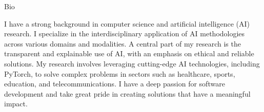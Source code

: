 \begin{rubric}{Bio}
\entry*[]

I have a strong background in computer science and artificial intelligence (AI) research. I specialize in the interdisciplinary application of AI methodologies across various domains and modalities. A central part of my research is the transparent and explainable use of AI, with an emphasis on ethical and reliable solutions. My research involves leveraging cutting-edge AI technologies, including PyTorch, to solve complex problems in sectors such as healthcare, sports, education, and telecommunications. I have a deep passion for software development and take great pride in creating solutions that have a meaningful impact.
\end{rubric}